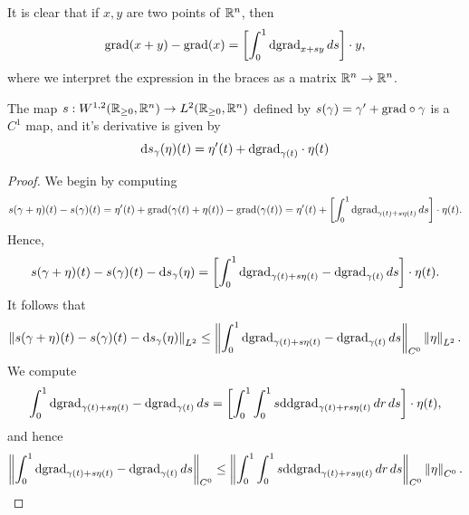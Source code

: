 \documentclass{amsart}
\begin{document}
It is clear that if $x,y$ are two points of $\mathbb{R}^{n}$, then
\begin{equation*}
  \mathrm{grad}(x+y)-\mathrm{grad}(x)=\left[\int_{0}^{1}\mathrm{d}\mathrm{grad}_{x+sy}\,ds\right]\cdot y,
\end{equation*}
where we interpret the expression in the braces as a matrix $\mathbb{R}^{n}\to \mathbb{R}^{n}$. 

\begin{claim}\label{claim:apr4_2}
  The map $s:W^{1,2}(\mathbb{R}_{\ge 0},\mathbb{R}^{n})\to L^{2}(\mathbb{R}_{\ge 0},\mathbb{R}^{n})$ defined by $s(\gamma)=\gamma'+\mathrm{grad}\circ \gamma$ is a $C^{1}$ map, and it's derivative is given by
  \begin{equation*}
    \mathrm{d} s_{\gamma}(\eta)(t)=\eta'(t)+\mathrm{d} \mathrm{grad}_{\gamma(t)}\cdot \eta(t)
  \end{equation*}
\end{claim}
\begin{proof}
  We begin by computing
  \begin{equation*}
    s(\gamma+\eta)(t)-s(\gamma)(t)=\eta'(t)+\mathrm{grad}(\gamma(t)+\eta(t))-\mathrm{grad}(\gamma(t))=\eta'(t)+\left[\int_{0}^{1}\mathrm{d}\mathrm{grad}_{\gamma(t)+s\eta(t)}\,ds\right]\cdot \eta(t).
  \end{equation*}
  Hence,
  \begin{equation*}
    s(\gamma+\eta)(t)-s(\gamma)(t)-\mathrm{d} s_{\gamma}(\eta)=\left[\int_{0}^{1}\mathrm{d}\mathrm{grad}_{\gamma(t)+s\eta(t)}-\mathrm{d}\mathrm{grad}_{\gamma(t)}\,d s\right]\cdot \eta(t).
  \end{equation*}
  It follows that
  \begin{equation*}
    \left\lVert s(\gamma+\eta)(t)-s(\gamma)(t)-\mathrm{d} s_{\gamma}(\eta)\right\rVert_{L^{2}}\le \left\lVert\int_{0}^{1}\mathrm{d}\mathrm{grad}_{\gamma(t)+s\eta(t)}-\mathrm{d}\mathrm{grad}_{\gamma(t)}\,d s\right\rVert_{C^{0}}\left\lVert\eta\right\rVert_{L^{2}}.
  \end{equation*}
  We compute
  \begin{equation*}
    \int_{0}^{1}\mathrm{d}\mathrm{grad}_{\gamma(t)+s\eta(t)}-\mathrm{d}\mathrm{grad}_{\gamma(t)}\,d s=\left[\int_{0}^{1}\int_{0}^{1}s\mathrm{d}\mathrm{d}\mathrm{grad}_{\gamma(t)+rs\eta(t)}\,dr\,ds \right]\cdot \eta(t),
  \end{equation*}
  and hence
  \begin{equation*}
    \norm{\int_{0}^{1}\d\grad_{\gamma(t)+s\eta(t)}-\d\grad_{\gamma(t)}\,d s}_{C^{0}}\le \norm{\int_{0}^{1}\int_{0}^{1}s\d\d\grad_{\gamma(t)+rs\eta(t)}\,dr\,ds}_{C^{0}}\norm{\eta}_{C^{0}}.

\end{equation*}
\end{proof}
\end{document}
